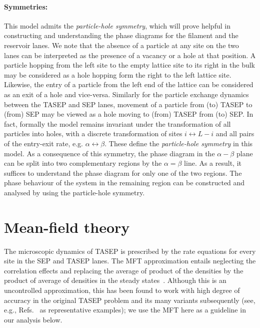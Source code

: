 \documentclass[aps,pre,twocolumn,superscriptaddress,amsmath,amssymb,longbibliography,floatfix,nofootinbib]{revtex4}
\begin{document}
\paragraph{Symmetries:}  This model admits   the {\em particle-hole symmetry}, which
will prove helpful in constructing and understanding the phase diagrams for the filament and the reservoir lanes.
We note that the absence of a particle at any site on the two lanes can be interpreted as the presence of a 
vacancy or a hole at that position. A particle hopping from the left site to the empty lattice
site to its right in the bulk may be considered as a hole hopping form the right to the left
lattice site. Likewise, the entry of a particle from the left end of the lattice can be 
considered as an exit of a hole and vice-versa. Similarly for the particle exchange dynamics between the TASEP and SEP lanes, movement of a particle from (to) TASEP to (from) SEP may be viewed as a hole moving to (from) TASEP from (to) SEP.
In fact, formally the model remains invariant under the
transformation of all particles into holes, with a discrete transformation of sites 
$i \leftrightarrow L - i$ and all pairs of the entry-exit rate, e.g. $\alpha \leftrightarrow \beta$. These define the {\em particle-hole symmetry} in this model.
As a consequence of this  symmetry, the phase diagram in the $\alpha-\beta$ plane
can be split into two complementary regions by the $\alpha = \beta$ line. As a result, it suffices
to understand the phase diagram for only one of the two regions.
The phase behaviour of the system in the remaining region can be constructed and analysed
by using the particle-hole symmetry.



\section{Mean-field theory}\label{mft}

The microscopic dynamics of TASEP is prescribed by the rate equations for
every site in the SEP and TASEP lanes. The MFT approximation entails neglecting the correlation effects and replacing the average of product of the densities by the product of average of densities in the steady states~\cite{tasep-rev}. Although this is an uncontrolled approximation, this has been found to work with high degree of accuracy in the original TASEP problem and its many variants subsequently (see, e.g., Refs.~\cite{frey-lktasep,niladri1,tirtha1} as representative examples); we use the MFT here as a guideline in our analysis below.
\end{document}
